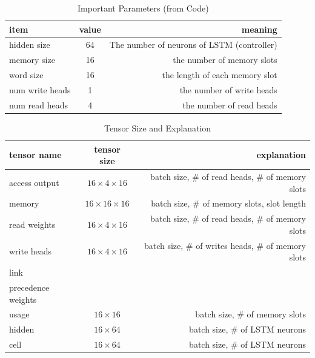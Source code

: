 \documentclass{article}
\begin{document}
\begin{table}[!htb]
\centering
\caption{Important Parameters (from Code)}
\begin{tabular}{| l | c | r |} \hline
item        & value & meaning \\ \hline
hidden size & 64 & The number of neurons of LSTM (controller) \\ \hline
memory size & 16 & the number of memory slots \\ \hline
word size & 16 & the length of each memory slot \\ \hline
num write heads & 1 & the number of write heads \\ \hline
num read heads  & 4 & the number of read heads \\ \hline
\end{tabular}
\end{table}

\begin{table}[!htb]
\centering
\caption{Tensor Size and Explanation}
\begin{tabular}{| l | c | r |} \hline
tensor name & tensor size & explanation \\ \hline
access output & $16\times4\times16$ & batch size, $\#$ of read heads, $\#$ of memory slots \\ \hline
memory & $16\times16\times16$ & batch size, $\#$ of memory slots, slot length \\ \hline
read weights & $16\times4\times16$ & batch size, $\#$ of read heads, $\#$ of memory slots \\ \hline
write heads & $16\times4\times16$ & batch size, $\#$ of writes heads, $\#$ of memory slots \\ \hline
link  &   &   \\ \hline
precedence weights  &   &   \\ \hline
usage  & $16\times16$  & batch size, $\#$ of memory slots \\ \hline
hidden  & $16\times64$  & batch size, $\#$ of LSTM neurons \\ \hline
cell  & $16\times64$  & batch size, $\#$ of LSTM neurons \\ \hline
\end{tabular}
\end{table}
\end{document}
